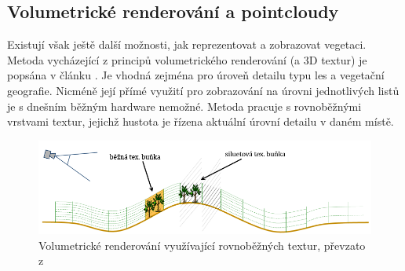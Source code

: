 \subsection{Volumetrické renderování a pointcloudy}
Existují však ještě další možnosti, jak reprezentovat a zobrazovat vegetaci. Metoda vycházející z principů volumetrického renderování (a 3D textur) je popsána v článku \cite{DN04}. Je vhodná zejména pro úroveň detailu typu les a vegetační geografie. Nicméně její přímé využití pro zobrazování na úrovni jednotlivých listů je s dnešním běžným hardware nemožné. Metoda pracuje s rovnoběžnými vrstvami textur, jejichž hustota je řízena aktuální úrovní detailu v daném místě.
\begin{figure}[here]
\begin{center}
\includegraphics[width=1.0\textwidth]{./figures/a1_slicing.png}
\end{center}
\caption{Volumetrické renderování využívající rovnoběžných textur, převzato z \cite{DN04}
}
\label{fig:VOLUME_texcells}
\end{figure}

